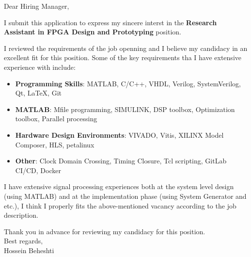 \documentclass[localFont]{awesome-source-cv} %
\begin{document}
\makecvheader


\bigskip %
Dear Hiring Manager,

\bigskip 

I submit this application to express my sincere interst in the \textbf{Research Assistant in FPGA Design and Prototyping} position.

I reviewed the requirements of the job openning and I believe my candidacy in an excellent fit for this position. Some of the key requirements tha I have extensive experience with include:

\begin{itemize}
	\item \textbf{Programming Skills}:
	      MATLAB, C/C++, VHDL, Verilog, SystemVerilog, Qt, \LaTeX, Git
	\item \textbf{MATLAB}:
	      Mfile programming, SIMULINK, DSP toolbox, Optimization toolbox, Parallel processing
	\item \textbf{Hardware Design Environments}:
	      VIVADO, Vitis, XILINX Model Composer, HLS, petalinux
	\item \textbf{Other}:
	      Clock Domain Crossing, Timing Closure, Tcl scripting, GitLab CI/CD, Docker
\end{itemize}

I have extensive signal processing experiences both at the system level design (using MATLAB) and at the implementation phase (using System Generator and etc.), I think I properly fits the above-mentioned vacancy according to the job description.


Thank you in advance for reviewing my candidacy for this position.\\
\bigskip 
Best regards,\\
\bigskip 
Hossein Beheshti \\
\end{document}
